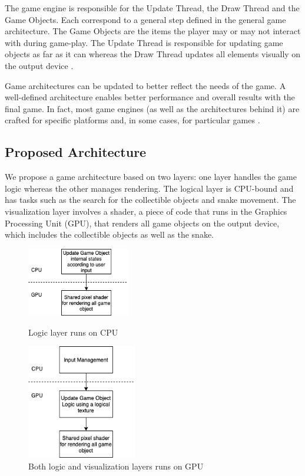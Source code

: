 \documentclass[runningheads]{llncs}
\begin{document}
The game engine is responsible for the Update Thread, the Draw Thread and the Game Objects. Each correspond to a general step defined in the general game architecture. The Game Objects are the items the player may or may not interact with during game-play. The Update Thread  is responsible for updating game objects as far as it can whereas the Draw Thread updates all elements visually on the output device \cite{portales}.

Game architectures can be updated to better reflect the needs of the game. A well-defined architecture enables better performance and overall results with the final game. In fact, most game engines (as well as the architectures behind it) are crafted for specific platforms and, in some cases, for particular games \cite{gregory_2019}.

\subsection{Proposed Architecture} \label{sec:proposed-architecture}
We propose a game architecture based on two layers:
one layer handles the game logic whereas the other manages rendering.  The logical layer is CPU-bound and has tasks such as the search for the collectible objects and snake movement.
The visualization layer involves a shader, a piece of code that runs in the Graphics Processing Unit (GPU), that renders all game objects on the output device, which includes the collectible objects as well as the snake.

\begin{figure}
    \centering
    \begin{minipage}[b][6cm][b]{.5\textwidth}
        \centering
        \includegraphics[height=3cm]{hci2020-paper/images/VRSnake_Proposed_Architecture.png}
        \caption{Logic layer runs on CPU}
        \label{fig:coupledModel}
    \end{minipage}%
    \begin{minipage}[b][6cm][b]{.5\textwidth}
        \centering
        \includegraphics[height=5cm]{hci2020-paper/images/VRSnake_Proposed_Architecture2.png}
        \caption{Both logic and visualization layers runs on GPU}
        \label{fig:uncoupledModel}
    \end{minipage}
\end{figure}
\end{document}
